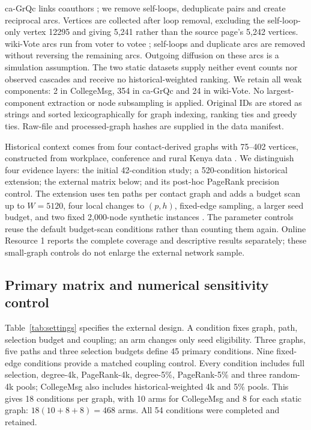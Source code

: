 \documentclass[smallextended]{svjour3}
\begin{document}
ca-GrQc links coauthors \cite{grqc}; we remove self-loops, deduplicate pairs and create reciprocal arcs. Vertices are collected after loop removal, excluding the self-loop-only vertex 12295 and giving 5,241 rather than the source page's 5,242 vertices. wiki-Vote arcs run from voter to votee \cite{signed,links}; self-loops and duplicate arcs are removed without reversing the remaining arcs. Outgoing diffusion on these arcs is a simulation assumption. The two static datasets supply neither event counts nor observed cascades and receive no historical-weighted ranking. We retain all weak components: 2 in CollegeMsg, 354 in ca-GrQc and 24 in wiki-Vote. No largest-component extraction or node subsampling is applied. Original IDs are stored as strings and sorted lexicographically for graph indexing, ranking ties and greedy ties. Raw-file and processed-graph hashes are supplied in the data manifest.

Historical context comes from four contact-derived graphs with 75--402 vertices, constructed from workplace, conference and rural Kenya data \cite{ref3,ref4,ref5,ref6}. We distinguish four evidence layers: the initial 42-condition study; a 520-condition historical extension; the external matrix below; and its post-hoc PageRank precision control. The extension uses ten paths per contact graph and adds a budget scan up to $W=5120$, four local changes to $(p,h)$, fixed-edge sampling, a larger seed budget, and two fixed 2,000-node synthetic instances \cite{ref17,ref18}. The parameter controls reuse the default budget-scan conditions rather than counting them again. Online Resource 1 reports the complete coverage and descriptive results separately; these small-graph controls do not enlarge the external network sample.

\subsection{Primary matrix and numerical sensitivity control}
Table~\ref{tab:settings} specifies the external design. A condition fixes graph, path, selection budget and coupling; an arm changes only seed eligibility. Three graphs, five paths and three selection budgets define 45 primary conditions. Nine fixed-edge conditions provide a matched coupling control. Every condition includes full selection, degree-4k, PageRank-4k, degree-5\%, PageRank-5\% and three random-4k pools; CollegeMsg also includes historical-weighted 4k and 5\% pools. This gives 18 conditions per graph, with 10 arms for CollegeMsg and 8 for each static graph: $18(10+8+8)=468$ arms. All 54 conditions were completed and retained.
\end{document}
